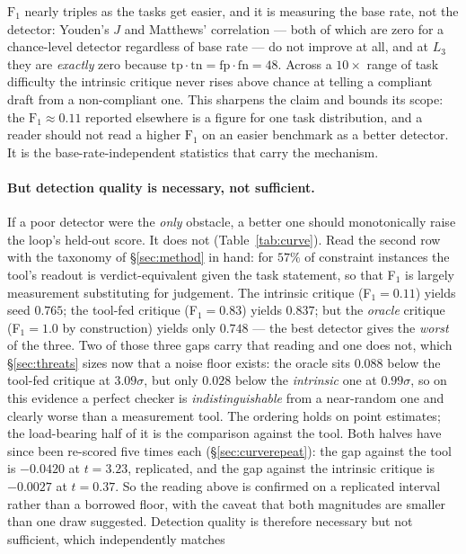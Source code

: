 \documentclass[11pt]{article}
\begin{document}
$\mathrm{F}_1$ nearly triples as the tasks get easier, and it is measuring the base rate, not
the detector: Youden's $J$ and Matthews' correlation --- both of which are zero for a
chance-level detector regardless of base rate --- do not improve at all, and at $L_3$ they are
\emph{exactly} zero because $\mathrm{tp}\cdot\mathrm{tn} = \mathrm{fp}\cdot\mathrm{fn} = 48$.
Across a $10\times$ range of task difficulty the intrinsic critique never rises above chance at
telling a compliant draft from a non-compliant one. This sharpens the claim and bounds its scope:
the $\mathrm{F}_1 \approx 0.11$ reported elsewhere is a figure for one task
distribution, and a reader should not read a higher $\mathrm{F}_1$ on an easier benchmark as a
better detector. It is the base-rate-independent statistics that carry the mechanism.

\paragraph{But detection quality is necessary, not sufficient.} If a poor detector were the \emph{only} obstacle, a better
one should monotonically raise the loop's held-out score. It does not
(Table~\ref{tab:curve}). Read the second row with the taxonomy of
\S\ref{sec:method} in hand: for $57\%$ of constraint instances the tool's readout is
verdict-equivalent given the task statement, so that F$_1$ is largely measurement substituting
for judgement. The intrinsic critique (F$_1\!=\!0.11$) yields seed
$0.765$; the tool-fed critique (F$_1\!=\!0.83$) yields $0.837$; but the
\emph{oracle} critique (F$_1\!=\!1.0$ by construction) yields only $0.748$ --- the
best detector gives the \emph{worst} of the three. Two of those three gaps carry that reading
and one does not, which \S\ref{sec:threats} sizes now that a noise floor exists: the oracle sits
$0.088$ below the tool-fed critique at $3.09\sigma$, but only $0.028$ below the
\emph{intrinsic} one at $0.99\sigma$, so on this evidence a perfect checker is
\emph{indistinguishable} from a near-random one and clearly worse than a measurement tool. The
ordering holds on point estimates; the load-bearing half of it is the comparison against the
tool. Both halves have since been re-scored five times each (\S\ref{sec:curverepeat}): the gap
against the tool is $-0.0420$ at $t = 3.23$, replicated, and the gap against the intrinsic
critique is $-0.0027$ at $t = 0.37$. So the reading above is confirmed on a replicated interval
rather than a borrowed floor, with the caveat that both magnitudes are smaller than one draw
suggested. Detection quality is therefore necessary but not sufficient, which independently matches
\end{document}

